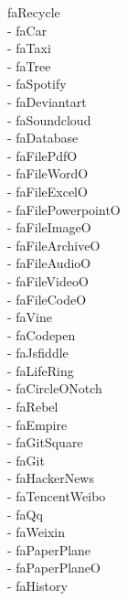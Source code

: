 \documentclass[%
               doublesided,
               paper=a4,
               fontsize=10pt
              ]{my-resume}
\begin{document}
faRecycle\\ \faCar - faCar\\ \faTaxi - faTaxi\\ \faTree - faTree\\ \faSpotify - faSpotify\\ \faDeviantart - faDeviantart\\ \faSoundcloud - faSoundcloud\\ \faDatabase - faDatabase\\ \faFilePdfO - faFilePdfO\\ \faFileWordO - faFileWordO\\ \faFileExcelO - faFileExcelO\\ \faFilePowerpointO - faFilePowerpointO\\ \faFileImageO - faFileImageO\\ \faFileArchiveO - faFileArchiveO\\ \faFileAudioO - faFileAudioO\\ \faFileVideoO - faFileVideoO\\ \faFileCodeO - faFileCodeO\\ \faVine - faVine\\ \faCodepen - faCodepen\\ \faJsfiddle - faJsfiddle\\ \faLifeRing - faLifeRing\\ \faCircleONotch - faCircleONotch\\ \faRebel - faRebel\\ \faEmpire - faEmpire\\ \faGitSquare - faGitSquare\\ \faGit - faGit\\ \faHackerNews - faHackerNews\\ \faTencentWeibo - faTencentWeibo\\ \faQq - faQq\\ \faWeixin - faWeixin\\ \faPaperPlane - faPaperPlane\\ \faPaperPlaneO - faPaperPlaneO\\ \faHistory - faHistory\\ \faCircleThin 
\end{document}
